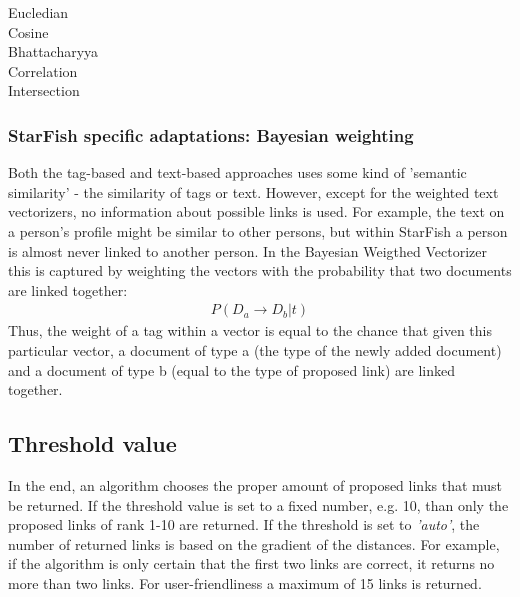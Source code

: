 \begin{description}
\item[Eucledian]
\item[Cosine]
\item[Bhattacharyya]
\item[Correlation]
\item[Intersection]
\end{description}

\subsubsection{StarFish specific adaptations: Bayesian weighting}
Both the tag-based and text-based approaches uses some kind of 'semantic similarity' - the similarity of tags or text. However, except for the weighted text vectorizers, no information about possible links is used. For example, the text on a person's profile might be similar to other persons, but within StarFish a person is almost never linked to another person. In the Bayesian Weigthed Vectorizer this is captured by weighting the vectors with the probability that two documents are linked together:
\begin{align}
\nonumber P(D_a \rightarrow D_b | t)
\end{align}
Thus, the weight of a tag within a vector is equal to the chance that given this particular vector, a document of type a (the type of the newly added document) and a document of type b (equal to the type of proposed link) are linked together.

\subsection{Threshold value}
In the end, an algorithm chooses the proper amount of proposed links that must be returned. If the threshold value is set to a fixed number, e.g. 10, than only the  proposed links of rank 1-10 are returned. If the threshold is set to \emph{'auto'}, the number of returned links is based on the gradient of the distances. For example, if the algorithm is only certain that the first two links are correct, it returns no more than two links. For user-friendliness a maximum of 15 links is returned. 